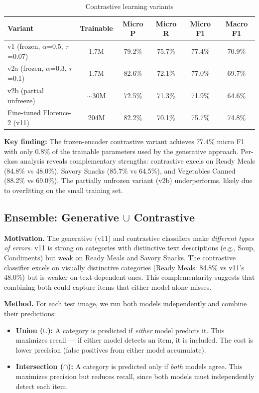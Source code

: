 \documentclass[11pt]{article}
\begin{document}
\begin{table}[h]
\centering
\caption{Contrastive learning variants}
\label{tab:contrastive}
\small
\begin{tabular}{lccccc}
\toprule
Variant & Trainable & Micro P & Micro R & Micro F1 & Macro F1 \\
\midrule
v1 (frozen, $\alpha$=0.5, $\tau$=0.07) & 1.7M & 79.2\% & 75.7\% & 77.4\% & 70.9\% \\
v2a (frozen, $\alpha$=0.3, $\tau$=0.1) & 1.7M & 82.6\% & 72.1\% & 77.0\% & 69.7\% \\
v2b (partial unfreeze) & $\sim$30M & 72.5\% & 71.3\% & 71.9\% & 64.6\% \\
\midrule
Fine-tuned Florence-2 (v11) & 204M & 82.2\% & 70.1\% & 75.7\% & 74.8\% \\
\bottomrule
\end{tabular}
\end{table}

\textbf{Key finding:} The frozen-encoder contrastive variant achieves 77.4\% micro F1 with only 0.8\% of the trainable parameters used by the generative approach. Per-class analysis reveals complementary strengths: contrastive excels on Ready Meals (84.8\% vs 48.0\%), Savory Snacks (85.7\% vs 64.5\%), and Vegetables Canned (88.2\% vs 69.0\%). The partially unfrozen variant (v2b) underperforms, likely due to overfitting on the small training set.

\subsection{Ensemble: Generative $\cup$ Contrastive}

\textbf{Motivation.} The generative (v11) and contrastive classifiers make \textit{different types of errors}. v11 is strong on categories with distinctive text descriptions (e.g., Soup, Condiments) but weak on Ready Meals and Savory Snacks. The contrastive classifier excels on visually distinctive categories (Ready Meals: 84.8\% vs v11's 48.0\%) but is weaker on text-dependent ones. This complementarity suggests that combining both could capture items that either model alone misses.

\textbf{Method.} For each test image, we run both models independently and combine their predictions:
\begin{itemize}[nosep,leftmargin=1.5em]
  \item \textbf{Union ($\cup$):} A category is predicted if \textit{either} model predicts it. This maximizes recall --- if either model detects an item, it is included. The cost is lower precision (false positives from either model accumulate).
  \item \textbf{Intersection ($\cap$):} A category is predicted only if \textit{both} models agree. This maximizes precision but reduces recall, since both models must independently detect each item.
\end{itemize}
\end{document}
